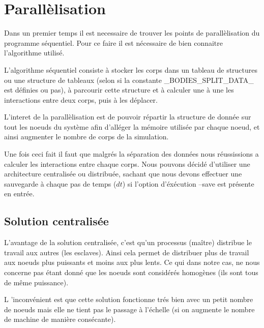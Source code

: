 \section{Parallèlisation}

\par Dans un premier temps il est necessaire de trouver les points de parallèlisation 
du programme séquentiel. Pour ce faire il est nécessaire de bien connaitre l'algorithme 
utilisé.\\
\par L'algorithme séquentiel consiste à stocker les corps dans un tableau de structures ou une structure 
de tableaux (selon si la constante \_BODIES\_SPLIT\_DATA\_ est définies ou pas), à parcourir 
cette structure et à calculer une à une les interactions entre deux corps, puis à les déplacer.\\

\par L'interet de la parallèlisation est de pouvoir répartir la structure de donnée sur tout les
noeuds du système afin d'alléger la mémoire utilisée par chaque noeud, et ainsi augmenter le 
nombre de corps de la simulation.\\

\par Une fois ceci fait il faut que malgrés la séparation des données nous réussissions a calculer
les interactions entre chaque corps. Nous pouvons décidé d'utiliser une architecture centralisée 
ou distribuée, sachant que nous devons effectuer une sauvegarde à chaque pas de temps ($dt$) si l'option 
d'éxécution --save est présente en entrée.\\

\subsection{Solution centralisée}
\par L'avantage de la solution centralisée, c'est qu'un processus (maître) distribue le travail aux autres
(les esclaves). Ainsi cela permet de distribuer plus de travail aux noeuds plus puissants et moins aux
plus lents. Ce qui dans notre cas, ne nous concerne pas étant donné que les noeuds sont considérés homogènes
(ils sont tous de même puissance).\\

\par L 'inconvénient est que cette solution fonctionne trés bien avec un petit nombre de noeuds 
mais elle ne tient pas le passage à l'échelle (si on augmente le nombre de machine 
de manière consécante).\\

